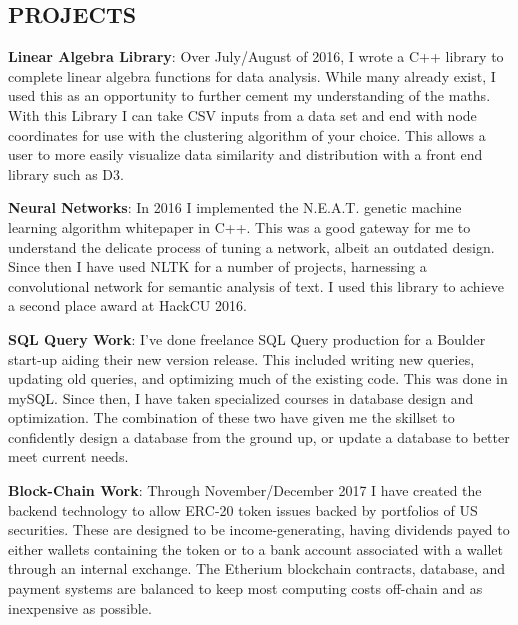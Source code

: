 \documentclass[margin]{res}
\begin{document}
\begin{resume}
\section{PROJECTS}
\par
\textbf{Linear Algebra Library}:
Over July/August of 2016, I wrote a C++ library to complete linear algebra functions for data analysis. While many already exist, I used this as an opportunity to further cement my understanding of the maths. With this Library I can take CSV inputs from a data set and end with node coordinates for use with the clustering algorithm of your choice. This allows a user to more easily visualize data similarity and distribution with a front end library such as D3. 
\par
\textbf{Neural Networks}: 
In 2016 I implemented the N.E.A.T. genetic machine learning algorithm whitepaper in C++. This was a good gateway for me to understand the delicate process of tuning a network, albeit an outdated design. Since then I have used NLTK for a number of projects, harnessing a convolutional network for semantic analysis of text. I used this library to achieve a second place award at HackCU 2016.
\par
\textbf{SQL Query Work}: 
I've done freelance SQL Query production for a Boulder start-up aiding their new version release. This included writing new queries, updating old queries, and optimizing much of the existing code. This was done in mySQL. Since then, I have taken specialized courses in database design and optimization. The combination of these two have given me the skillset to confidently design a database from the ground up, or update a database to better meet current needs.
\par
\textbf{Block-Chain Work}:
Through November/December 2017 I have created the backend technology to allow ERC-20 token issues backed by portfolios of US securities. These are designed to be income-generating, having dividends payed to either wallets containing the token or to a bank account associated with a wallet through an internal exchange. The Etherium blockchain contracts, database, and payment systems are balanced to keep most computing costs off-chain and as inexpensive as possible.



\end{resume}
\end{document}
